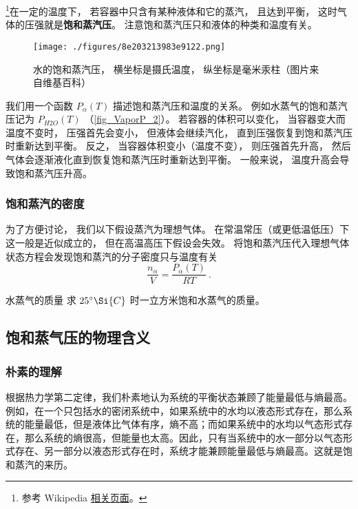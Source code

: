 

\footnote{参考 Wikipedia \href{https://en.wikipedia.org/wiki/Vapor_pressure}{相关页面}。}在一定的温度下， 若容器中只含有某种液体和它的蒸汽， 且达到平衡， 这时气体的压强就是\textbf{饱和蒸汽压}。 注意饱和蒸汽压只和液体的种类和温度有关。

\begin{figure}[ht]
\centering
\texttt{[image: ./figures/8e203213983e9122.png]}
\caption{水的饱和蒸汽压， 横坐标是摄氏温度， 纵坐标是毫米汞柱（图片来自维基百科）} \label{fig_VaporP_2}
\end{figure}

我们用一个函数 $P_\alpha(T)$ 描述饱和蒸汽压和温度的关系。 例如水蒸气的饱和蒸汽压记为 $P_{H2O}(T)$ （\autoref{fig_VaporP_2}）。 若容器的体积可以变化， 当容器变大而温度不变时， 压强首先会变小， 但液体会继续汽化， 直到压强恢复到饱和蒸汽压时重新达到平衡。 反之， 当容器体积变小（温度不变）， 则压强首先升高，  然后气体会逐渐液化直到恢复饱和蒸汽压时重新达到平衡。 一般来说， 温度升高会导致饱和蒸汽压升高。

\subsubsection{饱和蒸汽的密度}
为了方便讨论， 我们以下假设蒸汽为理想气体。 在常温常压（或更低温低压）下这一般是近似成立的， 但在高温高压下假设会失效。 将饱和蒸汽压代入理想气体状态方程会发现饱和蒸汽的分子密度只与温度有关
\begin{equation}\label{eq_VaporP_2}
\frac{n_\alpha}{V}  = \frac{P_\alpha(T)}{R T}~.
\end{equation}

\begin{exercise}{水蒸气的质量}
求 $25^\circ\Si{C}$ 时一立方米饱和水蒸气的质量。
\end{exercise}

\subsection{饱和蒸气压的物理含义}
\subsubsection{朴素的理解}
根据热力学第二定律，我们朴素地认为系统的平衡状态兼顾了能量最低与熵最高。例如，在一个只包括水的密闭系统中，如果系统中的水均以液态形式存在，那么系统的能量最低，但是液体比气体有序，熵不高；而如果系统中的水均以气态形式存在，那么系统的熵很高，但能量也太高。因此，只有当系统中的水一部分以气态形式存在、另一部分以液态形式存在时，系统才能兼顾能量最低与熵最高。这就是饱和蒸汽的来历。


